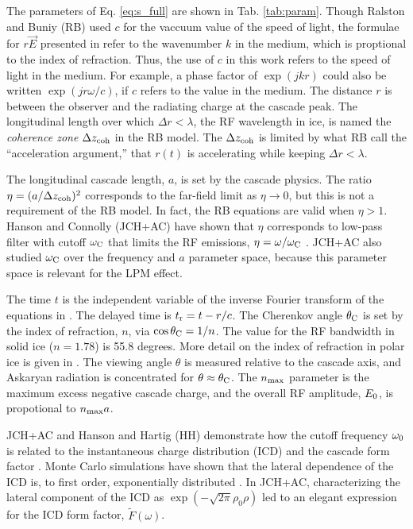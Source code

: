 \documentclass[amsmath,amssymb,aps,prd,10pt,twocolumn,showkeys]{revtex4}
\begin{document}
\begin{itemize}
The parameters of Eq. \ref{eq:s_full} are shown in Tab. \ref{tab:param}.  Though Ralston and Buniy (RB) \cite{10.1103/physrevd.65.016003} used $c$ for the vaccuum value of the speed of light, the formulae for $r \vec{E}$ presented in \cite{10.1103/physrevd.65.016003} refer to the wavenumber $k$ in the medium, which is proptional to the index of refraction. Thus, the use of $c$ in this work refers to the speed of light in the medium.  For example, a phase factor of $\exp(j k r)$ could also be written $\exp(j r \omega/c)$, if $c$ refers to the value in the medium.  The distance $r$ is between the observer and the radiating charge at the cascade peak.  The longitudinal length over which $\Delta r < \lambda$, the RF wavelength in ice, is named the \textit{coherence zone} $\Delta z_{\rm coh}$ in the RB model.  The $\Delta z_{\rm coh}$ is limited by what RB call the ``acceleration argument,'' that $r(t)$ is accelerating while keeping $\Delta r < \lambda$.

The longitudinal cascade length, $a$, is set by the cascade physics.  The ratio $\eta = (a/\Delta z_{\rm coh})^2$ corresponds to the far-field limit as $\eta \to 0$, but this is not a requirement of the RB model.  In fact, the RB equations are valid when $\eta > 1$.  Hanson and Connolly (JCH+AC) have shown that $\eta$ corresponds to low-pass filter with cutoff $\omega_{\rm C}$ that limits the RF emissions, $\eta = \omega/\omega_{\rm C}$ \cite{10.1016/j.astropartphys.2017.03.008}.  JCH+AC also studied $\omega_{\rm C}$ over the frequency and $a$ parameter space, because this parameter space is relevant for the LPM effect.

The time $t$ is the independent variable of the inverse Fourier transform of the equations in \cite{10.1103/physrevd.65.016003}. The delayed time is $t_{\rm r} = t-r/c$.  The Cherenkov angle $\theta_{\rm C}$ is set by the index of refraction, $n$, via $\cos\theta_{\rm C} = 1/n$.  The value for the RF bandwidth in solid ice ($n=1.78$) is 55.8 degrees.  More detail on the index of refraction in polar ice is given in \cite{Barwick:2018497,ALLISON201963}.  The viewing angle $\theta$ is measured relative to the cascade axis, and Askaryan radiation is concentrated for $\theta \approx \theta_{\rm C}$.  The $n_{\rm max}$ parameter is the maximum excess negative cascade charge, and the overall RF amplitude, $E_{\rm 0}$, is propotional to $n_{\rm max} a$.

JCH+AC and Hanson and Hartig (HH) demonstrate how the cutoff frequency $\omega_{\rm 0}$ is related to the instantaneous charge distribution (ICD) and the cascade form factor \cite{10.1016/j.astropartphys.2017.03.008,PhysRevD.105.123019}.  Monte Carlo simulations have shown that the lateral dependence of the ICD is, to first order, exponentially distributed \cite{zhs,PhysRevD.105.123019}.  In JCH+AC, characterizing the lateral component of the ICD as $\exp(-\sqrt{2\pi}\rho_0 \rho)$ led to an elegant expression for the ICD form factor, $\widetilde{F}(\omega)$.


\end{itemize}
\end{document}
